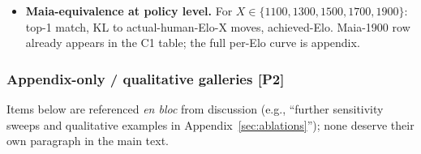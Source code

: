 \begin{itemize}[leftmargin=*]

    \item \textbf{Maia-equivalence at policy level.} For
    $X \in \{1100,1300,1500,1700,1900\}$: top-1 match, KL to
    actual-human-Elo-X moves, achieved-Elo. Maia-1900 row already
    appears in the C1 table; the full per-Elo curve is appendix.






\end{itemize}

\subsubsection*{Appendix-only / qualitative galleries [P2]}

Items below are referenced \emph{en bloc} from discussion (e.g.,
``further sensitivity sweeps and qualitative examples in
Appendix~\ref{sec:ablations}''); none deserve their own paragraph in
the main text.

